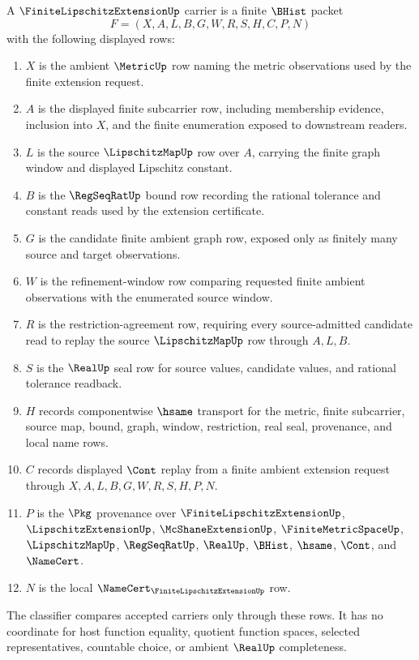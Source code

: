 \begin{definition}
\label{def:finite-lipschitz-extension-carrier}
A $\FiniteLipschitzExtensionUp$ carrier is a finite $\BHist$ packet
$$
F=(X,A,L,B,G,W,R,S,H,C,P,N)
$$
with the following displayed rows:
\begin{enumerate}
\item $X$ is the ambient $\MetricUp$ row naming the metric observations used by the finite extension request.
\item $A$ is the displayed finite subcarrier row, including membership evidence, inclusion into $X$, and the finite enumeration exposed to downstream readers.
\item $L$ is the source $\LipschitzMapUp$ row over $A$, carrying the finite graph window and displayed Lipschitz constant.
\item $B$ is the $\RegSeqRatUp$ bound row recording the rational tolerance and constant reads used by the extension certificate.
\item $G$ is the candidate finite ambient graph row, exposed only as finitely many source and target observations.
\item $W$ is the refinement-window row comparing requested finite ambient observations with the enumerated source window.
\item $R$ is the restriction-agreement row, requiring every source-admitted candidate read to replay the source $\LipschitzMapUp$ row through $A,L,B$.
\item $S$ is the $\RealUp$ seal row for source values, candidate values, and rational tolerance readback.
\item $H$ records componentwise $\hsame$ transport for the metric, finite subcarrier, source map, bound, graph, window, restriction, real seal, provenance, and local name rows.
\item $C$ records displayed $\Cont$ replay from a finite ambient extension request through $X,A,L,B,G,W,R,S,H,P,N$.
\item $P$ is the $\Pkg$ provenance over $\FiniteLipschitzExtensionUp$, $\LipschitzExtensionUp$, $\McShaneExtensionUp$, $\FiniteMetricSpaceUp$, $\LipschitzMapUp$, $\RegSeqRatUp$, $\RealUp$, $\BHist$, $\hsame$, $\Cont$, and $\NameCert$.
\item $N$ is the local $\NameCert_{\FiniteLipschitzExtensionUp}$ row.
\end{enumerate}
The classifier compares accepted carriers only through these rows. It has no coordinate for host function equality, quotient function spaces, selected representatives, countable choice, or ambient $\RealUp$ completeness.
\end{definition}

